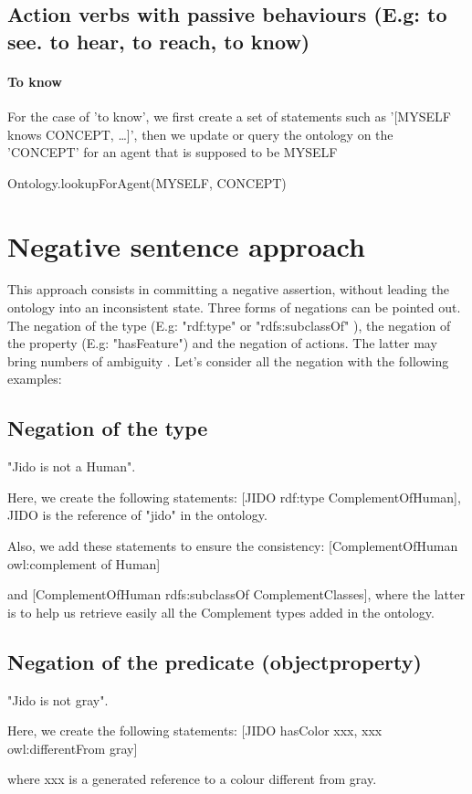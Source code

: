 \documentclass[twoside,a4paper,10pt]{report}
\newcommand{\dokutitleleveltree}[1]{\section{#1}}
\newcommand{\dokutitlelevelfour}[1]{\subsection{#1}}
\newcommand{\dokutitlelevelfive}[1]{\paragraph{#1}}
\begin{document}
\dokutitlelevelfour{Action verbs with passive behaviours (E.g: to see. to hear, to reach, to know)}

\small
\begin{verbatimtab}
\end{verbatimtab}
\normalsize

\dokutitlelevelfive{To know}

For the case of 'to know', we first create a set of statements such as '[MYSELF knows CONCEPT, \ldots{}]', then we update or query the ontology on the 'CONCEPT' for an agent that is supposed to be MYSELF


\small
\begin{verbatimtab}
      Ontology.lookupForAgent(MYSELF, CONCEPT)
             
\end{verbatimtab}
\normalsize

\dokutitleleveltree{Negative sentence approach}
\label{51e3775766a7025963abe3551cc8889c}%
This approach consists in committing a negative assertion, without leading the ontology into an inconsistent state. Three forms of negations can be pointed out.
The negation of the type (E.g: "rdf:type" or "rdfs:subclassOf" ), the negation of the property (E.g: "hasFeature") and the negation of actions. The latter may bring numbers of ambiguity .
Let's consider all the negation with the following examples:



\dokutitlelevelfour{Negation of the type}

\small
\begin{verbatimtab}
  
  "Jido is not a Human".
  
  Here, we create the following statements:
  [JIDO rdf:type ComplementOfHuman], JIDO is the reference of "jido" in the ontology.
  
  Also, we add these statements to ensure the consistency:
  [ComplementOfHuman owl:complement of Human]
  
  and 
  [ComplementOfHuman rdfs:subclassOf ComplementClasses], where the latter is to help us retrieve
easily all the Complement types added in the ontology.
  
\end{verbatimtab}
\normalsize

\dokutitlelevelfour{Negation of the predicate (object{\textunderscore}property)}

\small
\begin{verbatimtab}
  
  "Jido is not gray".
  
  Here, we create the following statements:
  [JIDO hasColor xxx,
  xxx owl:differentFrom gray]
  
  where xxx is a generated reference to a colour different from gray.
  
  
  
\end{verbatimtab}
\normalsize
\end{document}
